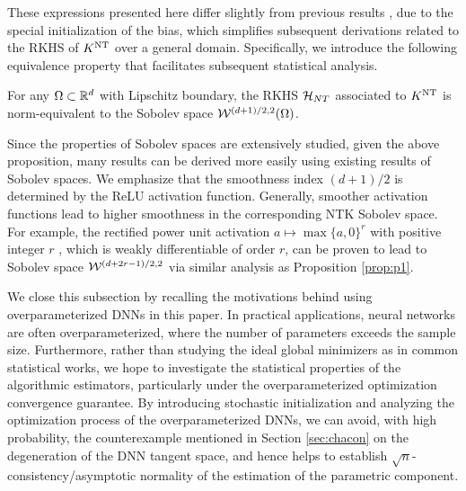 These expressions presented here differ slightly from previous results \citep{bietti2019inductive,geifman2020similarity}, due to the special initialization of the bias, which simplifies subsequent derivations related to the RKHS of $K^{\mathrm{NT}}$ over a general domain. Specifically, we introduce the following equivalence property that facilitates subsequent statistical analysis.



\begin{proposition}\label{prop:p1}
    For any $\Omega \subset  \mathbb{R}^d$ with Lipschitz boundary, the RKHS $\mathcal{H}_{NT}$ associated to $K^{\mathrm{NT}}$ is norm-equivalent to the Sobolev space $\mathcal{W}^{(d+1)/2,2}(\Omega)$. 
\end{proposition}


\begin{remark}
Since the properties of Sobolev spaces are extensively studied, given the above proposition, many results can be derived more easily using existing results of Sobolev spaces. 
We emphasize that the smoothness index $(d+1)/2$ is determined by the ReLU activation function. 
Generally, smoother activation functions lead to higher smoothness in the corresponding NTK Sobolev space. 
For example, the rectified power unit activation $a \mapsto \max \{a, 0\}^r$ with positive integer $r$ \citep{DBLP:journals/corr/Bach14, DBLP:journals/corr/abs-2109-06099}, which is weakly differentiable of order $r$, can be proven to lead to Sobolev space $\mathcal{W}^{(d+2r-1)/2,2}$ via similar analysis as Proposition \ref{prop:p1}. 
\end{remark}





We close this subsection by recalling the motivations behind using overparameterized DNNs in this paper. 
In practical applications, neural networks are often overparameterized, where the number of parameters exceeds the sample size. 
Furthermore, rather than studying the ideal global minimizers as in common statistical works, we hope to investigate the statistical properties of the algorithmic estimators, particularly under the overparameterized optimization convergence guarantee. 
By introducing stochastic initialization and analyzing the optimization process of the overparameterized DNNs, we can avoid, with high probability, the counterexample mentioned in Section \ref{sec:chacon} on the degeneration of the DNN tangent space, and hence helps to establish $\sqrt{n}$-consistency/asymptotic normality of the estimation of the parametric component.



